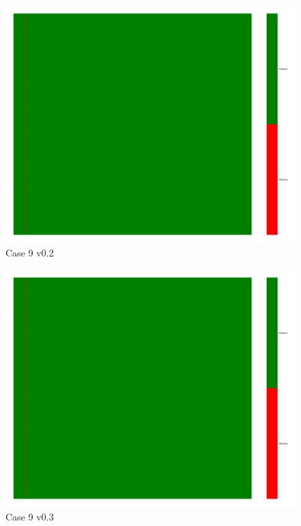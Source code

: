 \documentclass[a4paper,12pt]{article}
\begin{document}
\begin{figure}[H]
    \includegraphics[width=\linewidth]{case10_v0.2_heatmap_cleaned.png}
    \caption*{Case 9 v0.2}
\end{figure}

\begin{figure}[H]
    \includegraphics[width=\linewidth]{case10_v0.3_heatmap_cleaned.png}
    \caption*{Case 9 v0.3}
\end{figure}
\end{document}
